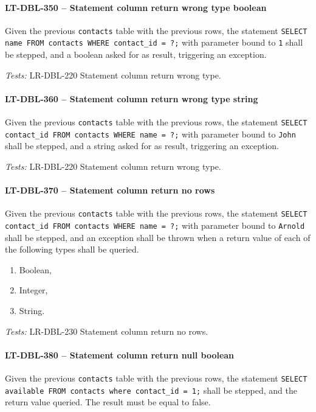 \paragraph{LT-DBL-350 -- Statement column return wrong type boolean}
Given the previous \lstinline{contacts} table with the previous rows,
the statement
\lstinline{SELECT name FROM contacts WHERE contact_id = ?;}
with parameter bound to \lstinline{1} shall be stepped,
and a boolean asked for as result, triggering an exception.

\textit{Tests: } LR-DBL-220 Statement column return wrong type.

\paragraph{LT-DBL-360 -- Statement column return wrong type string}
Given the previous \lstinline{contacts} table with the previous rows,
the statement
\lstinline{SELECT contact_id FROM contacts WHERE name = ?;}
with parameter bound to \lstinline{John} shall be stepped,
and a string asked for as result, triggering an exception.

\textit{Tests: } LR-DBL-220 Statement column return wrong type.

\paragraph{LT-DBL-370 -- Statement column return no rows}
Given the previous \lstinline{contacts} table with the previous rows,
the statement
\lstinline{SELECT contact_id FROM contacts WHERE name = ?;}
with parameter bound to \lstinline{Arnold} shall be stepped,
and an exception shall be thrown when a return value of each of
the following types shall be queried.
\begin{enumerate}
\item Boolean,
\item Integer,
\item String.
\end{enumerate}

\textit{Tests: } LR-DBL-230 Statement column return no rows.

\paragraph{LT-DBL-380 -- Statement column return null boolean}
Given the previous \lstinline{contacts} table with the previous rows,
the statement \lstinline{SELECT available FROM contacts where contact_id = 1;}
shall be stepped, and the return value queried. The result must be equal to
false.


